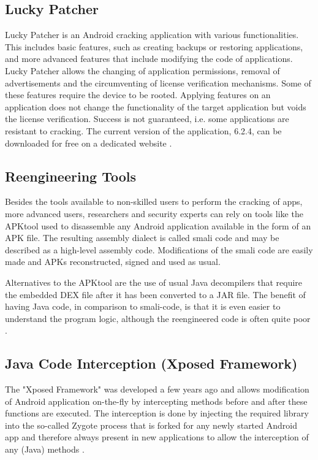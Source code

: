\documentclass{sig-alternate}
\begin{document}
\subsection{Lucky Patcher}
Lucky Patcher is an Android cracking application with various functionalities.
This includes basic features, such as creating backups or restoring applications, and more advanced features that include modifying the code of applications.
Lucky Patcher allows the changing of application permissions, removal of advertisements and the circumventing of license verification mechanisms.
Some of these features require the device to be rooted.
Applying features on an application does not change the functionality of the target application but voids the license verification.
Success is not guaranteed, i.e. some applications are resistant to cracking.
The current version of the application, 6.2.4, can be downloaded for free on a dedicated website \cite{luckypatcherPage}.

\subsection{Reengineering Tools}
Besides the tools available to non-skilled users to perform the cracking of apps, more advanced users, researchers and security experts can rely on tools like the APKtool \cite{apktool} used to disassemble any Android application available in the form of an APK file. The resulting assembly dialect is called smali code and may be described as a high-level assembly code. Modifications of the smali code are easily made and APKs reconstructed, signed and used as usual.

Alternatives to the APKtool are the use of usual Java decompilers that require the embedded DEX file after it has been converted to a JAR file. The benefit of having Java code, in comparison to smali-code, is that it is even easier to understand the program logic, although the reengineered code is often quite poor \cite{nils}.

\subsection{Java Code Interception (Xposed Framework) }
The "Xposed Framework" \cite{AT4} was developed a few years ago and allows modification of Android application on-the-fly by intercepting methods before and after these functions are executed. The interception is done by injecting the required library into the so-called Zygote process that is forked for any newly started Android app and therefore always present in new applications to allow the interception of any (Java) methods \cite{AT4}.
\end{document}
